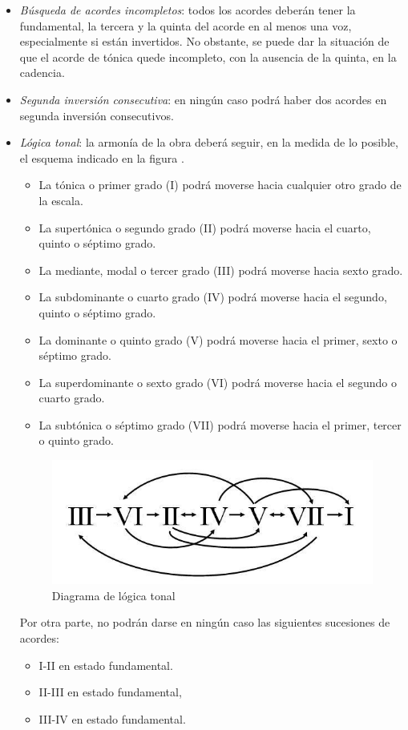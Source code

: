 \begin{itemize}
	\item \textit{Búsqueda de acordes incompletos}: todos los acordes deberán tener la fundamental, la tercera y la quinta del acorde en al menos una voz, especialmente si están invertidos. No obstante, se puede dar la situación de que el acorde de tónica quede incompleto, con la ausencia de la quinta, en la cadencia.

	\item \textit{Segunda inversión consecutiva}: en ningún caso podrá haber dos acordes en segunda inversión consecutivos.

	\item \textit{Lógica tonal}: la armonía de la obra deberá seguir, en la medida de lo posible, el esquema indicado en la figura .

		\begin{itemize}

			\item La tónica o primer grado (I) podrá moverse hacia cualquier otro grado de la escala.
			\item La supertónica o segundo grado (II) podrá moverse hacia el cuarto, quinto o séptimo grado.
			\item La mediante, modal o tercer grado (III) podrá moverse hacia sexto grado.
			\item La subdominante o cuarto grado (IV) podrá moverse hacia el segundo, quinto o séptimo grado.
			\item La dominante o quinto grado (V) podrá moverse hacia el primer, sexto o séptimo grado.
			\item La superdominante o sexto grado (VI) podrá moverse hacia el segundo o cuarto grado.
			\item La subtónica o séptimo grado (VII) podrá moverse hacia el primer, tercer o quinto grado.
		\end{itemize}

		\begin{figure}[H]
			\centering
			\includegraphics[scale=0.7]{imagenes/logica.jpg}
			\caption{Diagrama de lógica tonal}
			\label{fig2.1.7}
		\end{figure}

		Por otra parte, no podrán darse en ningún caso las siguientes sucesiones de acordes:

		\begin{itemize}
			\item I-II en estado fundamental.
			\item II-III en estado fundamental,
			\item III-IV en estado fundamental.
		\end{itemize}

\end{itemize}

